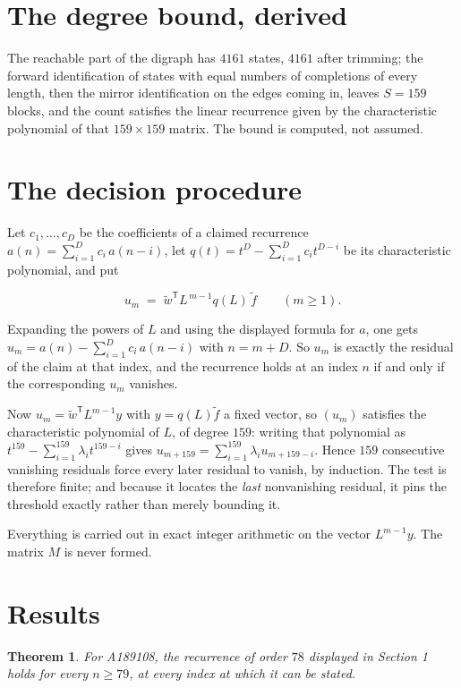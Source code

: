 \documentclass[11pt]{article}
\newtheorem{theorem}{Theorem}
\theoremstyle{definition}
\begin{document}
\section{The degree bound, derived}

The reachable part of the digraph has $4161$ states, $4161$ after trimming; the forward identification of states with equal numbers of completions of every length, then the mirror identification on the edges coming in, leaves $S = 159$ blocks, and the count satisfies the linear recurrence given by the characteristic polynomial of that $159\times159$ matrix. The bound is computed, not assumed.

\section{The decision procedure}

Let $c_1,\dots,c_D$ be the coefficients of a claimed recurrence $a(n) = \sum_{i=1}^{D} c_i\,a(n-i)$, let $q(t) = t^{D} - \sum_{i=1}^{D} c_i t^{D-i}$ be its characteristic polynomial, and put

\[u_m \;=\; \tilde w^{\mathsf T} L^{\,m-1} q(L)\,\tilde f \qquad (m \ge 1).\]

Expanding the powers of $L$ and using the displayed formula for $a$, one gets $u_m = a(n) - \sum_{i=1}^{D} c_i\,a(n-i)$ with $n = m + D$. So $u_m$ is exactly the residual of the claim at that index, and the recurrence holds at an index $n$ if and only if the corresponding $u_m$ vanishes.

Now $u_m = \tilde w^{\mathsf T} L^{m-1} y$ with $y = q(L)\tilde f$ a fixed vector, so $(u_m)$ satisfies the characteristic polynomial of $L$, of degree $159$: writing that polynomial as $t^{159} - \sum_{i=1}^{159} \lambda_i t^{159-i}$ gives $u_{m+159} = \sum_{i=1}^{159} \lambda_i u_{m+159-i}$. Hence $159$ consecutive vanishing residuals force every later residual to vanish, by induction. The test is therefore finite; and because it locates the {\itshape last} nonvanishing residual, it pins the threshold exactly rather than merely bounding it.

Everything is carried out in exact integer arithmetic on the vector $L^{m-1}y$. The matrix $M$ is never formed.

\section{Results}

\begin{theorem} For A189108, the recurrence of order $78$ displayed in Section 1 holds for every $n \ge 79$, at every index at which it can be stated.\end{theorem}
\end{document}
